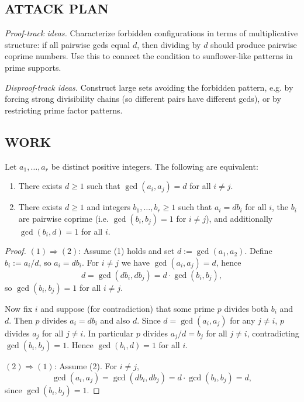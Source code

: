 \subsection*{ATTACK PLAN}
\emph{Proof-track ideas.} Characterize forbidden configurations in terms of multiplicative structure: if all pairwise gcds equal $d$, then dividing by $d$ should produce pairwise coprime numbers. Use this to connect the condition to sunflower-like patterns in prime supports.

\emph{Disproof-track ideas.} Construct large sets avoiding the forbidden pattern, e.g. by forcing strong divisibility chains (so different pairs have different gcds), or by restricting prime factor patterns.

\subsection*{WORK}
\begin{lemma}\label{lem:535-char}
Let $a_1,\dots,a_r$ be distinct positive integers. The following are equivalent:
\begin{enumerate}
\item There exists $d\ge 1$ such that $\gcd(a_i,a_j)=d$ for all $i\ne j$.
\item There exists $d\ge 1$ and integers $b_1,\dots,b_r\ge 1$ such that $a_i=db_i$ for all $i$, the $b_i$ are pairwise coprime (i.e. $\gcd(b_i,b_j)=1$ for $i\ne j$), and additionally $\gcd(b_i,d)=1$ for all $i$.
\end{enumerate}
\end{lemma}
\begin{proof}
$(1)\Rightarrow(2)$: Assume (1) holds and set $d:=\gcd(a_1,a_2)$. Define $b_i:=a_i/d$, so $a_i=db_i$.
For $i\ne j$ we have $\gcd(a_i,a_j)=d$, hence
\[
d=\gcd(db_i,db_j)=d\cdot \gcd(b_i,b_j),
\]
so $\gcd(b_i,b_j)=1$ for all $i\ne j$.

Now fix $i$ and suppose (for contradiction) that some prime $p$ divides both $b_i$ and $d$. Then $p$ divides $a_i=db_i$ and also $d$. Since $d=\gcd(a_i,a_j)$ for any $j\ne i$, $p$ divides $a_j$ for all $j\ne i$. In particular $p$ divides $a_j/d=b_j$ for all $j\ne i$, contradicting $\gcd(b_i,b_j)=1$. Hence $\gcd(b_i,d)=1$ for all $i$.

$(2)\Rightarrow(1)$: Assume (2). For $i\ne j$,
\[
\gcd(a_i,a_j)=\gcd(db_i,db_j)=d\cdot \gcd(b_i,b_j)=d,
\]
since $\gcd(b_i,b_j)=1$.
\end{proof}

